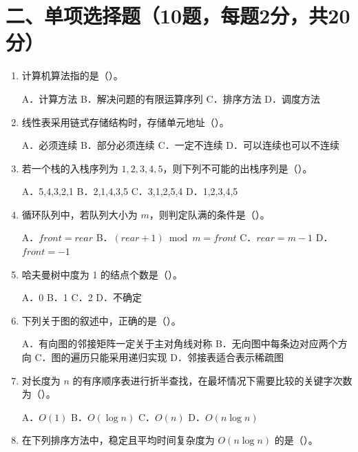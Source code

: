 \documentclass{../../note}
\begin{document}
\section*{二、单项选择题（10题，每题2分，共20分）}

\begin{enumerate}[itemsep=0.8em]
\item 计算机算法指的是（\hspace{0.8cm}）。

A．计算方法 \quad B．解决问题的有限运算序列 \quad C．排序方法 \quad D．调度方法

\item 线性表采用链式存储结构时，存储单元地址（\hspace{0.8cm}）。

A．必须连续 \quad B．部分必须连续 \quad C．一定不连续 \quad D．可以连续也可以不连续

\item 若一个栈的入栈序列为 $1,2,3,4,5$，则下列不可能的出栈序列是（\hspace{0.8cm}）。

A．5,4,3,2,1 \quad B．2,1,4,3,5 \quad C．3,1,2,5,4 \quad D．1,2,3,4,5

\item 循环队列中，若队列大小为 $m$，则判定队满的条件是（\hspace{0.8cm}）。

A．$front=rear$ \quad B．$(rear+1)\bmod m=front$ \quad C．$rear=m-1$ \quad D．$front=-1$

\item 哈夫曼树中度为 1 的结点个数是（\hspace{0.8cm}）。

A．0 \quad B．1 \quad C．2 \quad D．不确定

\item 下列关于图的叙述中，正确的是（\hspace{0.8cm}）。

A．有向图的邻接矩阵一定关于主对角线对称
\quad B．无向图中每条边对应两个方向
\quad C．图的遍历只能采用递归实现
\quad D．邻接表适合表示稀疏图

\item 对长度为 $n$ 的有序顺序表进行折半查找，在最坏情况下需要比较的关键字次数为（\hspace{0.8cm}）。

A．$O(1)$ \quad B．$O(\log n)$ \quad C．$O(n)$ \quad D．$O(n\log n)$

\item 在下列排序方法中，稳定且平均时间复杂度为 $O(n\log n)$ 的是（\hspace{0.8cm}）。


\end{enumerate}
\end{document}

